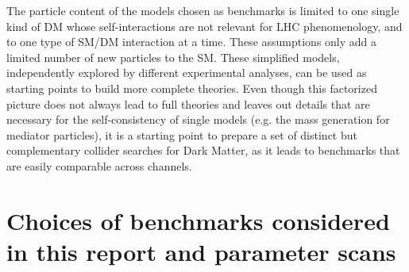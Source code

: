 The particle content of the models chosen as benchmarks is limited to
one single kind of DM whose self-interactions are not relevant for LHC
phenomenology, and to one type of SM/DM interaction at a time. These
assumptions only add a limited number of new particles to the
SM. These simplified models, independently explored by different
experimental analyses, can be used as starting points to build more
complete theories. Even though this factorized picture does not always
lead to full theories and leaves out details that are necessary for
the self-consistency of single models (e.g. the mass generation for
mediator particles), it is a starting point to prepare a set of
distinct but complementary collider searches for Dark Matter, as
it leads to benchmarks that are easily comparable across channels.

\section{Choices of benchmarks considered in this report and parameter scans}

